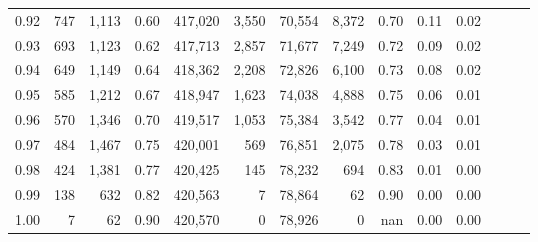 \begin{tabular}{rrrrrrrrrrrrrr}
0.92 &    747 &  1,113 &  0.60 &  417,020 &    3,550 &  70,554 &   8,372 &  0.70 &  0.11 &      0.02 \\
0.93 &    693 &  1,123 &  0.62 &  417,713 &    2,857 &  71,677 &   7,249 &  0.72 &  0.09 &      0.02 \\
0.94 &    649 &  1,149 &  0.64 &  418,362 &    2,208 &  72,826 &   6,100 &  0.73 &  0.08 &      0.02 \\
0.95 &    585 &  1,212 &  0.67 &  418,947 &    1,623 &  74,038 &   4,888 &  0.75 &  0.06 &      0.01 \\
0.96 &    570 &  1,346 &  0.70 &  419,517 &    1,053 &  75,384 &   3,542 &  0.77 &  0.04 &      0.01 \\
0.97 &    484 &  1,467 &  0.75 &  420,001 &      569 &  76,851 &   2,075 &  0.78 &  0.03 &      0.01 \\
0.98 &    424 &  1,381 &  0.77 &  420,425 &      145 &  78,232 &     694 &  0.83 &  0.01 &      0.00 \\
0.99 &    138 &    632 &  0.82 &  420,563 &        7 &  78,864 &      62 &  0.90 &  0.00 &      0.00 \\
1.00 &      7 &     62 &  0.90 &  420,570 &        0 &  78,926 &       0 &   nan &  0.00 &      0.00 \\
\bottomrule
\end{tabular}
